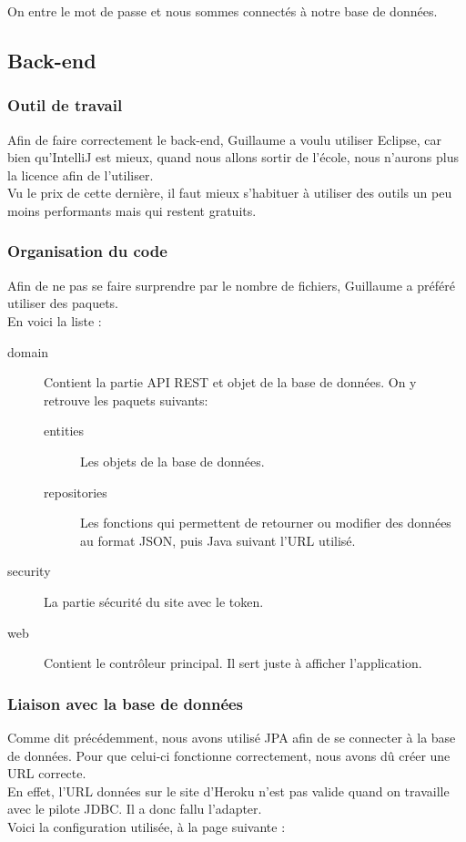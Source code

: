 On entre le mot de passe et nous sommes connectés à notre base de données.

\clearpage

\subsection{Back-end}
\subsubsection{Outil de travail}
Afin de faire correctement le back-end, Guillaume a voulu utiliser Eclipse, car bien qu'IntelliJ est mieux, quand nous allons sortir de l'école, nous n'aurons plus la licence afin de l'utiliser. \\
Vu le prix de cette dernière, il faut mieux s'habituer à utiliser des outils un peu moins performants mais qui restent gratuits.

\subsubsection{Organisation du code}
Afin de ne pas se faire surprendre par le nombre de fichiers, Guillaume a préféré utiliser des paquets. \\
En voici la liste :
\begin{description}
	\item[domain] Contient la partie API REST et objet de la base de données. On y retrouve les paquets suivants:
	\begin{description}
		\item[entities] Les objets de la base de données.
		\item[repositories] Les fonctions qui permettent de retourner ou modifier des données au format JSON, puis Java suivant l'URL utilisé.
	\end{description}
	\item[security] La partie sécurité du site avec le token.
	\item[web] Contient le contrôleur principal. Il sert juste à afficher l'application.
\end{description}

\subsubsection{Liaison avec la base de données}
Comme dit précédemment, nous avons utilisé JPA afin de se connecter à la base de données. Pour que celui-ci fonctionne correctement, nous avons dû créer une URL correcte. \\
En effet, l'URL données sur le site d'Heroku n'est pas valide quand on travaille avec le pilote JDBC. Il a donc fallu l'adapter. \\
Voici la configuration utilisée, à la page suivante :

